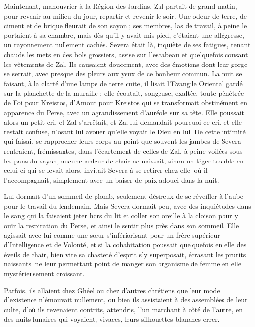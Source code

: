 \documentclass[a4paper, 11pt, oneside, polutonikogreek, french]{article}
\begin{document}
Maintenant, manouvrier à la Région des Jardins, Zal partait de grand matin, pour revenir au milieu du jour, repartir et revenir le soir. Une odeur de terre, de ciment et de brique fleurait de son sayon ; ses membres, las de travail, à peine le portaient à sa chambre, mais dès qu'il y avait mis pied, c'étaient une allégresse, un rayonnement nullement cachés. Severa était là, inquiète de ses fatigues, tenant chauds les mets en des bols grossiers, assise sur l'escabeau et quelquefois cousant les vêtements de Zal. Ils causaient doucement, avec des émotions dont leur gorge se serrait, avec presque des pleurs aux yeux de ce bonheur commun. La nuit se faisant, à la clarté d'une lampe de terre cuite, il lisait l'Evangile Oriental gardé sur la planchette de la muraille ; elle écoutait, songeuse, exaltée, toute pénétrée de Foi pour Kreistos, d'Amour pour Kreistos qui se transformait obstinément en apparence du Perse, avec un agrandissement d'auréole sur sa tête. Elle poussait alors un petit cri, et Zal s'arrêtait, et Zal lui demandait pourquoi ce cri, et elle restait confuse, n'osant lui avouer qu'elle voyait le Dieu en lui. De cette intimité qui faisait se rapprocher leurs corps au point que souvent les jambes de Severa rentraient, frémissantes, dans l'écartement de celles de Zal, à peine voilées sous les pans du sayon, aucune ardeur de chair ne naissait, sinon un léger trouble en celui-ci qui se levait alors, invitait Severa à se retirer chez elle, où il l'accompagnait, simplement avec un baiser de paix adouci dans la nuit.

Lui dormait d'un sommeil de plomb, seulement désireux de se réveiller à l'aube pour le travail du lendemain. Mais Severa dormait peu, avec des inquiétudes dans le sang qui la faisaient jeter hors du lit et coller son oreille à la cloison pour y ouïr la respiration du Perse, et ainsi le sentir plus près dans son sommeil. Elle agissait avec lui comme une sœur s'infériorisant pour un frère supérieur d'Intelligence et de Volonté, et si la cohabitation poussait quelquefois en elle des éveils de chair, bien vite sa chasteté d'esprit s'y superposait, écrasant les prurits naissants, ne leur permettant point de manger son organisme de femme en elle mystérieusement croissant.

Parfois, ils allaient chez Ghéel ou chez d'autres chrétiens que leur mode d'existence n'émouvait nullement, ou bien ils assistaient à des assemblées de leur culte, d'où ils revenaient contrits, attendris, l'un marchant à côté de l'autre, en des nuits lunaires qui voyaient, vivaces, leurs silhouettes blanches errer.
\end{document}

